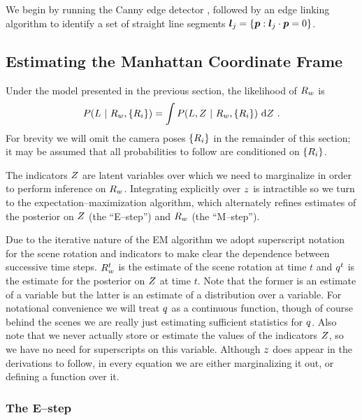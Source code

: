 We begin by running the Canny edge detector \cite{Canny86}, followed
by an edge linking algorithm \cite{Zhang02} to identify a set of
straight line segments $\LineSeg_j = \{\Pixel : \LineSeg_j\cdot\Pixel
= 0\}$.

\subsection{Estimating the Manhattan Coordinate Frame}

Under the model presented in the previous section, the
likelihood of $\SceneR$ is
\begin{equation}
  P(\LineSegs ~|~ \SceneR,\{\CamR_i\}) =
    \int P(\LineSegs,\Indicators ~|~ \SceneR,\{\CamR_i\})
    ~\intd\Indicators ~.
\end{equation}
For brevity we will omit the camera poses $\{\CamR_i\}$ in the
remainder of this section; it may be assumed that all probabilities
to follow are conditioned on $\{\CamR_i\}$.

The indicators $\Indicators$ are latent variables over which we need
to marginalize in order to perform inference on $\SceneR$. Integrating
explicitly over $\Indicator$ is intractible so we turn to the
expectation--maximization algorithm, which alternately refines
estimates of the posterior on $\Indicators$ (the ``E--step'') and
$\SceneR$ (the ``M--step'').

Due to the iterative nature of the EM algorithm we adopt superscript
notation for the scene rotation and indicators to make clear the
dependence between successive time steps. $\SceneR^t$ is the estimate
of the scene rotation at time $t$ and $\PosteriorEst^t$ is the
estimate for the posterior on $\Indicators$ at time $t$. Note that the
former is an estimate of a variable but the latter is an estimate of a
distribution over a variable. For notational convenience we will treat
$\PosteriorEst$ as a continuous function, though of course behind the
scenes we are really just estimating sufficient statistics for
$\PosteriorEst$. Also note that we never actually store or estimate
the values of the indicators $\Indicators$, so we have no need for
superscripts on this variable. Although $\Indicator$ does appear in
the derivations to follow, in every equation we are either
marginalizing it out, or defining a function over it.

\subsubsection{The E--step}

